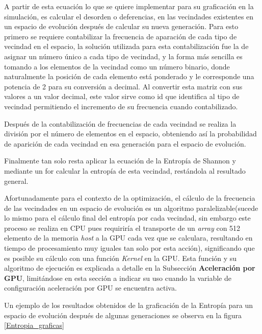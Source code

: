 \documentclass[]{article}
\begin{document}
			A partir de esta ecuación lo que se quiere implementar para su graficación en la simulación, es calcular el desorden o deferencias, en las vecindades existentes en un espacio de evolución después de calcular su nueva generación. Para esto primero se requiere contabilizar la frecuencia de aparación de cada tipo de vecindad en el espacio, la solución utilizada para esta contabilización fue la de asignar un número único a cada tipo de vecindad, y la forma más sencilla es tomando a los elementos de la vecindad como un número binario, donde naturalmente la posición de cada elemento está ponderado y le corresponde una potencia de 2 para su conversión a decimal. Al convertir esta matriz con sus valores a un valor decimal, este valor sirve como id que identifica al tipo de vecindad permitiendo el incremento de su frecuencia cuando contabilizado.
			
			Después de la contabilización de frecuencias de cada vecindad se realiza la división por el número de elementos en el espacio, obteniendo así la probabilidad de aparición de cada vecindad en esa generación para el espacio de evolución.
			
			Finalmente tan solo resta aplicar la ecuación de la Entropía de Shannon y mediante un for calcular la entropía de esta vecindad, restándola al resultado general.
			
			Afortunadamente para el contexto de la optimización, el cálculo de la frecuencia de las vecindades en un espacio de evolución es un algoritmo paralelizable(sucede lo mismo para el cálculo final del entropía por cada vecindad, sin embargo este proceso se realiza en CPU pues requiriría el transporte de un \textit{array} con 512 elemento de la memoria \textit{host} a la GPU cada vez que se calculara, resultando en tiempo de procesamiento muy iguales tan solo por esta acción), significando que es posible su cálculo con una función \textit{Kernel} en la GPU. Esta función y su algoritmo de ejecución es explicada a detalle en la Subsección \textbf{Aceleración por GPU}, limitándose en esta sección a indicar su uso cuando la variable de configuración aceleración por GPU se encuentra activa.
			
			Un ejemplo de los resultados obtenidos de la graficación de la Entropía para un espacio de evolución después de algunas generaciones se observa en la figura \ref{Entropia_graficas}
			
\end{document}
